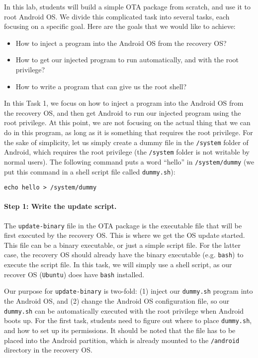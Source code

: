 In this lab, students will build a simple OTA package from scratch, and 
use it to root Android OS. We divide this complicated task into several
tasks, each focusing on a specific goal. Here are the goals that we would
like to achieve:

\begin{itemize} 
\item How to inject a program into the Android OS from the recovery OS?
\item How to get our injected program to run automatically, and with the root privilege?
\item How to write a program that can give us the root shell?
\end{itemize} 
  

In this Task 1, we focus on how to inject a program into the Android OS
from the recovery OS, and then get Android to run our injected program
using the root privilege. At this point, we are not focusing on the
actual thing that we can do in this program, as long as it is something that
requires the root privilege. For the sake of simplicity, let us simply
create a dummy file in the \texttt{/system} folder of Android, which
requires the root privilege (the \texttt{/system} folder is not 
writable by normal users). The following command puts a word
``hello'' in \texttt{/system/dummy} (we put this command in a shell script 
file called \texttt{dummy.sh}):  

\begin{lstlisting}
echo hello > /system/dummy
\end{lstlisting}



\paragraph{Step 1: Write the update script.}
The \texttt{update-binary} file in the OTA package is the executable file 
that will be first executed by the recovery OS. This is where we get the OS update started.
This file can be a binary executable, or just a simple script file. For the
latter case, the recovery OS should already have the binary executable
(e.g. \texttt{bash}) to execute the script file. In this task, we will
simply use a shell script, as our recover OS (\texttt{Ubuntu}) does have 
\texttt{bash} installed. 


Our purpose for \texttt{update-binary} is two-fold: (1) inject our \texttt{dummy.sh} program
into the Android OS, and (2) change the Android OS configuration file, so 
our \texttt{dummy.sh} can be automatically executed with the root privilege
when Android boots up. For the first task, students need to figure out
where to place \texttt{dummy.sh}, and how to set up its permissions. 
It should be noted that the file has to be placed into the Android
partition, which is already mounted to the \texttt{/android} directory in
the recovery OS. 


